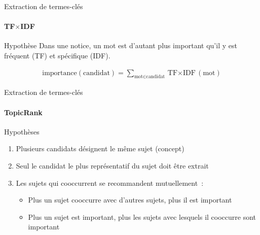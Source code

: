   \begin{frame}{Extraction de termes-clés}
    \framesubtitle{TF$\times$IDF}

    \begin{block}{Hypothèse}
      Dans une notice, un mot est d'autant plus important qu'il  y est fréquent
      (TF) et spécifique (IDF).
    \end{block}

    \begin{align*}
      \text{importance}(\text{candidat}) = \sum_{\text{mot} \in \text{candidat}} \text{TF$\times$IDF}(\text{mot})
    \end{align*}
  \end{frame}

  \begin{frame}{Extraction de termes-clés}
    \framesubtitle{TopicRank}

    \begin{block}{Hypothèses}
      \begin{enumerate}
        \item{Plusieurs candidats désignent le même sujet (concept)}
        \item{Seul le candidat le plus représentatif du sujet doit être extrait}
        \item{Les sujets qui cooccurrent se recommandent mutuellement~:}
        \begin{itemize}
          \item{Plus un sujet cooccurre avec d'autres sujets, plus il est
                important}
          \item{Plus un sujet est important, plus les sujets avec lesquels il
                cooccurre sont important}
        \end{itemize}
      \end{enumerate}
    \end{block}
  \end{frame}

